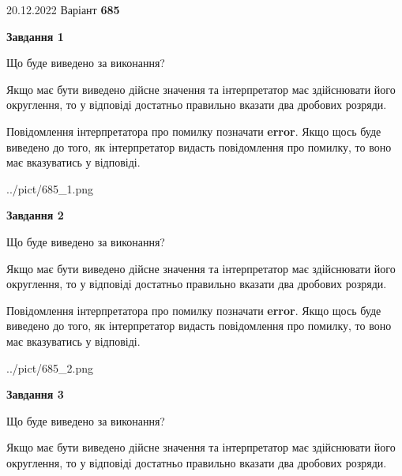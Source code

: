 \documentclass[12pt, ukrainian]{article}
\begin{document}
{20.12.2022 Варіант \No \textbf { 685 }\par}
{
\begin {Large}

{\begin {center}\textbf{Завдання 1}\end {center}}\par
Що буде виведено за виконання? \par

Якщо має бути виведено дійсне значення та інтерпретатор має здійснювати його округлення, 
то у відповіді достатньо правильно вказати два дробових розряди.

Повідомлення інтерпретатора про помилку позначати \textbf{error}.
Якщо щось буде виведено до того, як інтерпретатор видасть повідомлення про помилку, 
то воно має вказуватись у відповіді. \par

\begin{center}
	{../pict/685_1.png}
\end{center}
\newpage

{\begin {center}\textbf{Завдання 2}\end {center}}\par
Що буде виведено за виконання? \par

Якщо має бути виведено дійсне значення та інтерпретатор має здійснювати його округлення, 
то у відповіді достатньо правильно вказати два дробових розряди.

Повідомлення інтерпретатора про помилку позначати \textbf{error}.
Якщо щось буде виведено до того, як інтерпретатор видасть повідомлення про помилку, 
то воно має вказуватись у відповіді. \par

\begin{center}
	{../pict/685_2.png}
\end{center}
\newpage

{\begin {center}\textbf{Завдання 3}\end {center}}\par
Що буде виведено за виконання? \par

Якщо має бути виведено дійсне значення та інтерпретатор має здійснювати його округлення, 
то у відповіді достатньо правильно вказати два дробових розряди.


\end{Large}}
\end{document}

